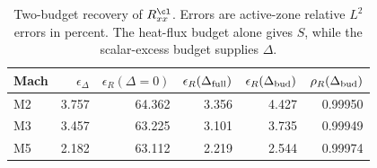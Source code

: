 \begin{table}
  \begin{center}
  \caption{Two-budget recovery of $R^{\cl}_{xx}$.  Errors are active-zone relative $L^2$ errors in percent.  The heat-flux budget alone gives $S$, while the scalar-excess budget supplies $\Delta$.}
  \label{tab:two_budget}
  \begin{tabular}{lrrrrr}
  \toprule
  Mach & $\epsilon_\Delta$ & $\epsilon_R(\Delta=0)$ & $\epsilon_R(\Delta_{\rm full})$ & $\epsilon_R(\Delta_{\rm bud})$ & $\rho_R(\Delta_{\rm bud})$\\
  \midrule
  M2 & 3.757 & 64.362 & 3.356 & 4.427 & 0.99950\\
  M3 & 3.457 & 63.225 & 3.101 & 3.735 & 0.99949\\
  M5 & 2.182 & 63.112 & 2.219 & 2.544 & 0.99974\\
  \bottomrule
  \end{tabular}
  \end{center}
\end{table}

